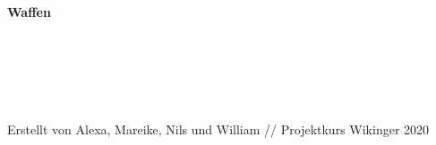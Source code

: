 \documentclass[12pt,a4paper,ngerman,openany]{book}
\newcommand{\timage}[1]{\framebox{\texttt{[image: \#1]}}} %
\begin{document}
\pagebreak

\textbf{Waffen}\\\\
\timage{bogen.jpeg} \vspace{0.5cm} \timage{breitaxt.jpeg} \vspace{0.5cm} \timage{handaxt.jpeg}\\\\
\timage{langsax.jpeg} \vspace{0.5cm} \timage{speer2.jpeg} \vspace{0.5cm} \timage{streitaxt.jpeg}\\\\
\timage{wurfaxt.jpeg} \vspace{0.5cm} \timage{suontaka.jpeg}

\newpage
\vspace*{24cm} Erstellt von Alexa, Mareike, Nils und William // Projektkurs Wikinger 2020
\thispagestyle{empty}
\newpage

\thispagestyle{empty}
\end{document}
